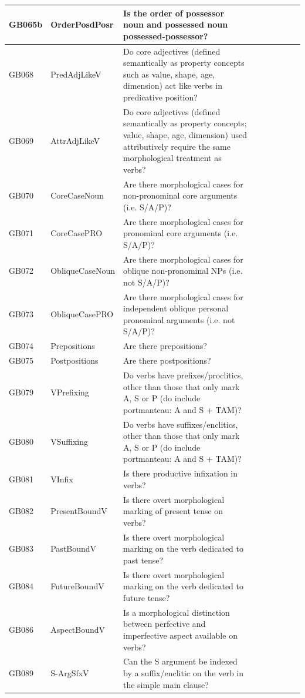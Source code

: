 \documentclass[draft,10pt]{article} %
\begin{document}
\begin{landscape}
\begin{longtable}{| l | p{4cm}| p{12cm}|p{2cm}|p{2cm}|p{2cm}|p{2cm}|p{2cm}|p{2cm}|}
GB065b & OrderPosdPosr&Is the order of possessor noun and possessed noun possessed-possessor?\\ \hline
GB068 & PredAdjLikeV&Do core adjectives (defined semantically as property concepts such as value, shape, age, dimension) act like verbs in predicative position?\\ \hline
GB069 & AttrAdjLikeV&Do core adjectives (defined semantically as property concepts; value, shape, age, dimension) used attributively require the same morphological treatment as verbs?\\ \hline
GB070 & CoreCaseNoun&Are there morphological cases for non-pronominal core arguments (i.e. S/A/P)?\\ \hline
GB071 & CoreCasePRO&Are there morphological cases for pronominal core arguments (i.e. S/A/P)?\\ \hline
GB072 & ObliqueCaseNoun&Are there morphological cases for oblique non-pronominal NPs (i.e. not S/A/P)?\\ \hline
GB073 & ObliqueCasePRO&Are there morphological cases for independent oblique personal pronominal arguments (i.e. not S/A/P)?\\ \hline
GB074 & Prepositions&Are there prepositions?\\ \hline
GB075 & Postpositions&Are there postpositions?\\ \hline
GB079 & VPrefixing&Do verbs have prefixes/proclitics, other than those that only mark A, S or P (do include portmanteau: A and S + TAM)?\\ \hline
GB080 & VSuffixing&Do verbs have suffixes/enclitics, other than those that only mark A, S or P (do include portmanteau: A and S + TAM)?\\ \hline
GB081 & VInfix&Is there productive infixation in verbs?\\ \hline
GB082 & PresentBoundV&Is there overt morphological marking of present tense on verbs?\\ \hline
GB083 & PastBoundV&Is there overt morphological marking on the verb dedicated to past tense?\\ \hline
GB084 & FutureBoundV&Is there overt morphological marking on the verb dedicated to future tense?\\ \hline
GB086 & AspectBoundV&Is a morphological distinction between perfective and imperfective aspect available on verbs?\\ \hline
GB089 & S-ArgSfxV&Can the S argument be indexed by a suffix/enclitic on the verb in the simple main clause?\\ \hline

\end{longtable}
\end{landscape}
\end{document}
